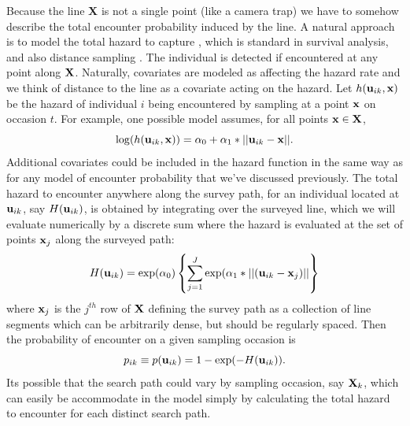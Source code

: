 Because the line {\bf X} is not a single point (like a camera trap) we
have to somehow describe the total encounter probability induced by
the line. A natural approach is to model the total hazard to capture
\citep{borchers_efford:2008}, which is standard in survival analysis,
and also distance sampling \citep{hayes_buckland:1983,
  skaug_schweder:1999}.  The individual is detected
if encountered at any point along ${\bf X}$. Naturally,
covariates are modeled as affecting the hazard rate and we think of
distance to the line as a covariate acting on the hazard. Let $h({\bf
  u}_{ik},{\bf x})$ be the hazard of individual $i$ being encountered
by sampling at a point ${\bf x}$ on occasion $t$.  For example, one
possible model assumes, for all points ${\bf x} \in {\bf X}$,
\begin{equation}
\log(h({\bf u}_{ik},{\bf x})) = \alpha_{0} + \alpha_{1}*||{\bf u}_{ik}-{\bf x}||.
\label{eq.hazard}
\end{equation}
Additional covariates could be included in the hazard function in the
same way as for any model of encounter probability that we've
discussed previously.  The total hazard to encounter anywhere along
the survey path, for an individual located at ${\bf u}_{ik}$, say
$H({\bf u}_{ik})$, is obtained by integrating over the surveyed line,
which we will evaluate numerically by a discrete sum where the hazard
is evaluated at the set of points ${\bf x}_{j}$ along the surveyed
path:
\begin{equation}
H({\bf u}_{ik}) =  \exp(\alpha_{0}) \left\{ \sum_{j=1}^{J}  \exp(\alpha_{1}*||({\bf
    u}_{ik} - {\bf x}_{j})|| \right\}
\label{eq.totalhazard}
\end{equation}
where ${\bf x}_{j}$ is the $j^{th}$ row of ${\bf X}$ defining the
survey path as a collection of line segments which can be arbitrarily
dense, but should be regularly spaced.  Then the probability of
encounter on a given sampling occasion  is
\begin{equation}
p_{ik} \equiv p({\bf u}_{ik}) = 1- \exp(-H({\bf u}_{ik})).
\label{search-encounter.eq.encounterprob}
\end{equation}
Its possible that the search path could vary by sampling occasion, say
${\bf X}_{k}$, which can easily be accommodate in the model simply by
calculating the total hazard to encounter for each distinct search
path.

